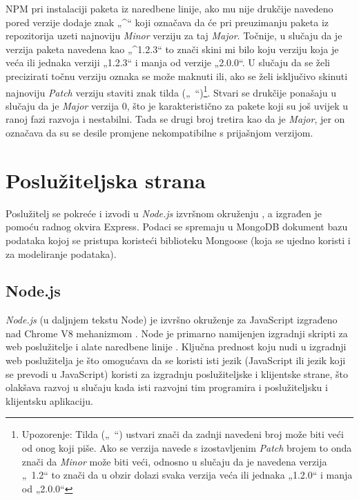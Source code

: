\documentclass[times, utf8, diplomski, numeric]{fer}
\newcommand{\razmakp}{\vspace{18pt}}
\begin{document}
\razmakp

NPM pri instalaciji paketa iz naredbene linije, ako mu nije drukčije navedeno pored verzije dodaje znak „\string^“ koji označava da će pri preuzimanju paketa iz repozitorija uzeti najnoviju \emph{Minor} verziju za taj \emph{Major}.
Točnije, u slučaju da je verzija paketa navedena kao „\string^1.2.3“ to znači skini mi bilo koju verziju koja je veća ili jednaka verziji „1.2.3“ i manja od verzije „2.0.0“.
U slučaju da se želi precizirati točnu verziju oznaka se može maknuti ili, ako se želi isključivo skinuti najnoviju \emph{Patch} verziju staviti znak tilda („\string~“)\footnote{
    Upozorenje: Tilda („\string~“) ustvari znači da zadnji navedeni broj može biti veći od onog koji piše. Ako se verzija navede s izostavljenim \emph{Patch} brojem to onda znači da \emph{Minor} može biti veći, odnosno u slučaju da je navedena verzija „\string~1.2“ to znači da u obzir dolazi svaka verzija veća ili jednaka „1.2.0“ i manja od „2.0.0“
}.
Stvari se drukčije ponašaju u slučaju da je \emph{Major} verzija 0, što je karakteristično za pakete koji su još uvijek u ranoj fazi razvoja i nestabilni.
Tada se drugi broj tretira kao da je \emph{Major}, jer on označava da su se desile promjene nekompatibilne s prijašnjom verzijom\citep{npm_docs}.


\newpage
\section{Poslužiteljska strana}

Poslužitelj se pokreće i izvodi u \emph{Node.js} izvršnom okruženju , a izgrađen je pomoću radnog okvira  Express.
Podaci se spremaju u MongoDB dokument bazu podataka  kojoj se pristupa koristeći biblioteku Mongoose (koja se ujedno koristi i za modeliranje podataka).


\subsection{Node.js}

\emph{Node.js} (u daljnjem tekstu Node) je izvršno okruženje za JavaScript izgrađeno nad Chrome V8 mehanizmom .
Node je primarno namijenjen izgradnji skripti za web poslužitelje i alate naredbene linije .
Ključna prednost koju nudi u izgradnji web poslužitelja je što omogućava da se koristi isti jezik (JavaScript ili jezik koji se prevodi u JavaScript) koristi za izgradnju poslužiteljske i klijentske strane, što olakšava razvoj u slučaju kada isti razvojni tim programira i poslužiteljsku i klijentsku aplikaciju\citep{wiki_node}.
\end{document}
